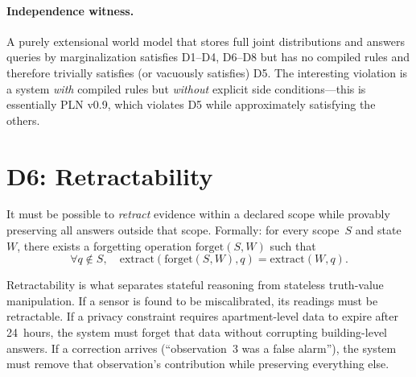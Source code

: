 \paragraph{Independence witness.}
A purely extensional world model that stores full joint distributions
and answers queries by marginalization satisfies D1--D4, D6--D8 but
has no compiled rules and therefore trivially satisfies (or vacuously
satisfies) D5.  The interesting violation is a system \emph{with}
compiled rules but \emph{without} explicit side conditions---this is
essentially PLN v0.9, which violates D5 while approximately
satisfying the others.



\section{D6: Retractability}
\label{sec:d6}

\begin{definition}
\label{def:d6}
It must be possible to \emph{retract} evidence within a declared scope
while provably preserving all answers outside that scope.
Formally: for every scope~$S$ and state~$W$, there exists a
forgetting operation $\mathrm{forget}(S, W)$ such that
\[
  \forall q \notin S,\quad
  \mathrm{extract}(\mathrm{forget}(S, W), q) = \mathrm{extract}(W, q).
\]
\end{definition}

\noindent
Retractability is what separates stateful reasoning from stateless
truth-value manipulation.  If a sensor is found to be miscalibrated,
its readings must be retractable.  If a privacy constraint requires
apartment-level data to expire after 24~hours, the system must forget
that data without corrupting building-level answers.  If a correction
arrives (``observation~3 was a false alarm''), the system must remove
that observation's contribution while preserving everything else.

